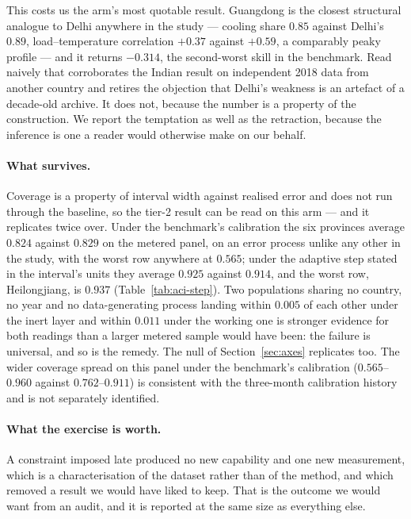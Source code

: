 This costs us the arm's most quotable result. Guangdong is the closest structural
analogue to Delhi anywhere in the study --- cooling share $0.85$ against Delhi's
$0.89$, load--temperature correlation $+0.37$ against $+0.59$, a comparably peaky
profile --- and it returns $-0.314$, the second-worst skill in the benchmark.
Read naively that corroborates the Indian result on independent 2018 data from
another country and retires the objection that Delhi's weakness is an artefact of
a decade-old archive. It does not, because the number is a property of the
construction. We report the temptation as well as the retraction, because the
inference is one a reader would otherwise make on our behalf.

\paragraph{What survives.} Coverage is a property of interval width against
realised error and does not run through the baseline, so the tier-2 result can be
read on this arm --- and it replicates twice over. Under the benchmark's
calibration the six provinces average $0.824$ against $0.829$ on the metered
panel, on an error process unlike any other in the study, with the worst row
anywhere at $0.565$; under the adaptive step stated in the interval's units
they average $0.925$ against $0.914$, and the worst row, Heilongjiang, is
$0.937$ (Table~\ref{tab:aci-step}). Two populations sharing no country, no
year and no data-generating process landing within $0.005$ of each other under
the inert layer and within $0.011$ under the working one is stronger evidence
for both readings than a larger metered sample would have been: the failure is
universal, and so is the remedy. The null of Section~\ref{sec:axes} replicates
too. The wider coverage spread on this panel under the benchmark's calibration
($0.565$--$0.960$ against $0.762$--$0.911$) is consistent with the three-month
calibration history and is not separately identified.

\paragraph{What the exercise is worth.} A constraint imposed late produced no new
capability and one new measurement, which is a characterisation of the dataset
rather than of the method, and which removed a result we would have liked to
keep. That is the outcome we would want from an audit, and it is reported at the
same size as everything else.
